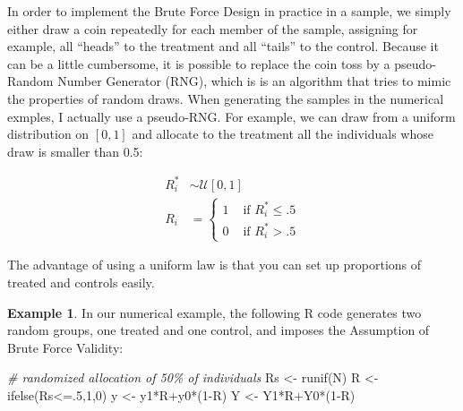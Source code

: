 \documentclass[
]{book}
\newenvironment{Shaded}{\begin{snugshade}}{\end{snugshade}}
\newcommand{\CommentTok}[1]{\textcolor[rgb]{0.56,0.35,0.01}{\textit{#1}}}
\newcommand{\DecValTok}[1]{\textcolor[rgb]{0.00,0.00,0.81}{#1}}
\newcommand{\FunctionTok}[1]{\textcolor[rgb]{0.00,0.00,0.00}{#1}}
\newcommand{\NormalTok}[1]{#1}
\newcommand{\OtherTok}[1]{\textcolor[rgb]{0.56,0.35,0.01}{#1}}
\newcommand{\SpecialCharTok}[1]{\textcolor[rgb]{0.00,0.00,0.00}{#1}}
\theoremstyle{definition}
\theoremstyle{definition}
\newtheorem{example}{Example}[chapter]
\theoremstyle{definition}
\theoremstyle{definition}
\theoremstyle{remark}
\begin{document}
In order to implement the Brute Force Design in practice in a sample, we simply either draw a coin repeatedly for each member of the sample, assigning for example, all ``heads'' to the treatment and all ``tails'' to the control.
Because it can be a little cumbersome, it is possible to replace the coin toss by a pseudo-Random Number Generator (RNG), which is is an algorithm that tries to mimic the properties of random draws.
When generating the samples in the numerical exmples, I actually use a pseudo-RNG.
For example, we can draw from a uniform distribution on \([0,1]\) and allocate to the treatment all the individuals whose draw is smaller than 0.5:

\begin{align*}
  R_i^* & \sim \mathcal{U}[0,1]\\
  R_i & = 
  \begin{cases}
    1 & \text{ if } R_i^*\leq .5 \\
    0 & \text{ if } R_i^*> .5 
  \end{cases}
\end{align*}

The advantage of using a uniform law is that you can set up proportions of treated and controls easily.

\begin{example}
\protect\hypertarget{exm:unnamed-chunk-68}{}{\label{exm:unnamed-chunk-68} }In our numerical example, the following R code generates two random groups, one treated and one control, and imposes the Assumption of Brute Force Validity:
\end{example}

\begin{Shaded}
\begin{Highlighting}[]
\CommentTok{\# randomized allocation of 50\% of individuals}
\NormalTok{Rs }\OtherTok{\textless{}{-}} \FunctionTok{runif}\NormalTok{(N)}
\NormalTok{R }\OtherTok{\textless{}{-}} \FunctionTok{ifelse}\NormalTok{(Rs}\SpecialCharTok{\textless{}=}\NormalTok{.}\DecValTok{5}\NormalTok{,}\DecValTok{1}\NormalTok{,}\DecValTok{0}\NormalTok{)}
\NormalTok{y }\OtherTok{\textless{}{-}}\NormalTok{ y1}\SpecialCharTok{*}\NormalTok{R}\SpecialCharTok{+}\NormalTok{y0}\SpecialCharTok{*}\NormalTok{(}\DecValTok{1}\SpecialCharTok{{-}}\NormalTok{R)}
\NormalTok{Y }\OtherTok{\textless{}{-}}\NormalTok{ Y1}\SpecialCharTok{*}\NormalTok{R}\SpecialCharTok{+}\NormalTok{Y0}\SpecialCharTok{*}\NormalTok{(}\DecValTok{1}\SpecialCharTok{{-}}\NormalTok{R)}
\end{Highlighting}
\end{Shaded}
\end{document}
